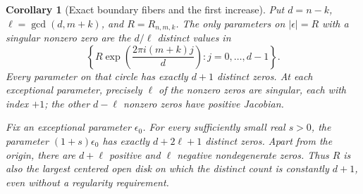 \documentclass[UTF8,11pt]{ctexart}
\newtheorem{cor}[thm]{Corollary}
\theoremstyle{definition}
\numberwithin{equation}{section}
\begin{document}
\begin{cor}[Exact boundary fibers and the first increase]
\label{v7:cor:firstincrease}
Put $d=n-k$, $\ell=\gcd(d,m+k)$, and $R=R_{n,m,k}$.
The only parameters on $|\epsilon|=R$ with a singular nonzero
zero are the $d/\ell$ distinct values in
\begin{equation}\label{v7:eq:boundaryparameters}
 \left\{R\exp\left(\frac{2\pi i(m+k)j}{d}\right):
                    j=0,\ldots,d-1\right\}.
\end{equation}
Every parameter on that circle has exactly $d+1$ distinct zeros.
At each exceptional parameter, precisely $\ell$ of the nonzero
zeros are singular, each with index $+1$; the other $d-\ell$
nonzero zeros have positive Jacobian.

Fix an exceptional parameter $\epsilon_0$. For every sufficiently
small real $s>0$, the parameter $(1+s)\epsilon_0$ has exactly
$d+2\ell+1$ distinct zeros. Apart from the origin, there are
$d+\ell$ positive and $\ell$ negative nondegenerate zeros.
Thus $R$ is also the largest centered open disk on which the
distinct count is constantly $d+1$, even without a regularity requirement.
\end{cor}
\end{document}
